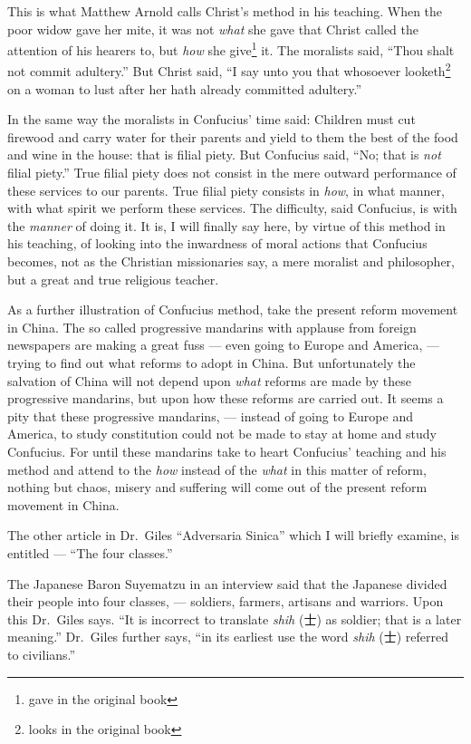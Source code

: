This is what Matthew Arnold calls Christ's method in his teaching.
When the poor widow gave her mite, it was not \emph{what} she gave that Christ called the attention of his hearers to, but \emph{how} she give\footnote{gave in the original book}  it.
The moralists said, ``Thou shalt not commit adultery.''
But Christ said, ``I say unto you that whosoever looketh\footnote{looks in the original book} on a woman to lust after her hath already committed adultery.''

In the same way the moralists in Confucius' time said: Children must cut firewood and carry water for their parents and yield to them the best of the food and wine in the house: that is filial piety.
But Confucius said, ``No; that is \emph{not} filial piety.''
True filial piety does not consist in the mere outward performance of these services to our parents.
True filial piety consists in \emph{how}, in what manner, with what spirit we perform these services.
The difficulty, said Confucius, is with the \emph{manner} of doing it.
It is, I will finally say here, by virtue of this method in his teaching, of looking into the inwardness of moral actions that Confucius becomes, not as the Christian missionaries say, a mere moralist and philosopher, but a great and true religious teacher.

As a further illustration of Confucius method, take the present reform movement in China.
The so called progressive mandarins with applause from foreign newspapers are making a great fuss --- even going to Europe and America, --- trying to find out what reforms to adopt in China.
But unfortunately the salvation of China will not depend upon \emph{what} reforms are made by these progressive mandarins, but upon how these reforms are carried out.
It seems a pity that these progressive mandarins, --- instead of going to Europe and America, to study constitution could not be made to stay at home and study Confucius.
For until these mandarins take to heart Confucius' teaching and his method and attend to the \emph{how} instead of the \emph{what} in this matter of reform, nothing but chaos, misery and suffering will come out of the present reform movement in China.

The other article in Dr.~Giles ``Adversaria Sinica'' which I will briefly examine, is entitled --- ``The four classes.''

The Japanese Baron Suyematzu  in an interview said that the Japanese divided their people into four classes, --- soldiers, farmers, artisans and warriors.
Upon this Dr.~Giles says. ``It is incorrect to translate \emph{shih} (士) as soldier; that is a later meaning.''
Dr.~Giles further says, ``in its earliest use the word \emph{shih} (士) referred to civilians.''

